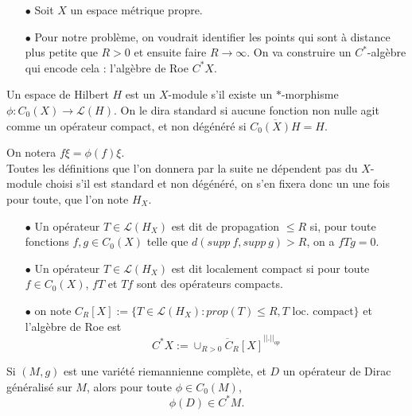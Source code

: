 \documentclass{beamer}
\begin{document}
\begin{frame}
\begin{itemize}
\item[$\bullet$] Soit $X$ un espace métrique propre. %
\item[$\bullet$] Pour notre problème, on voudrait identifier les points qui sont à distance plus petite que $R>0$ et ensuite faire $R\rightarrow \infty$. On va construire un $C^*$-algèbre qui encode cela : l'algèbre de Roe $C^* X$.\\
\end{itemize}

\begin{definition}
Un espace de Hilbert $H$ est un $X$-module s'il existe un $*$-morphisme $\phi : C_0(X)\rightarrow \mathcal L(H)$. On le dira standard si aucune fonction non nulle agit comme un opérateur compact, et non dégénéré si $\overline{C_0(X)H}=H$.
\end{definition}
On notera $f\xi= \phi(f)\xi$.\\
Toutes les définitions que l'on donnera par la suite ne dépendent pas du $X$-module choisi s'il est standard et non dégénéré, on s'en fixera donc un une fois pour toute, que l'on note $H_X$.
\end{frame}

\begin{frame}
\begin{definition}%
\begin{itemize}
\item[$\bullet$]Un opérateur $T\in \mathcal L(H_X)$ est dit de propagation $\leq R$ si, pour toute fonctions $f,g\in C_0(X)$ telle que $d(supp\ f, supp\ g) >R$, on a $fTg=0$.
\item[$\bullet$] Un opérateur $T\in \mathcal L(H_X)$ est dit localement compact si pour toute $f\in C_0(X)$, $fT$ et $Tf$ sont des opérateurs compacts.
\item[$\bullet$] on note $C_R[X]:=\{T\in \mathcal L(H_X) : prop(T)\leq R, T \text{ loc. compact}\}$ et l'algèbre de Roe est  \[C^*X:=\overline{\cup_{R>0} C_R[X]}^{||.||_{op}}\]
\end{itemize}
\end{definition}
Si $(M,g)$ est une variété riemannienne complète, et $D$ un opérateur de Dirac généralisé sur $M$, alors pour toute $\phi\in C_0(M)$,
\[\phi(D)\in C^*M.\]
\end{frame}
\end{document}
